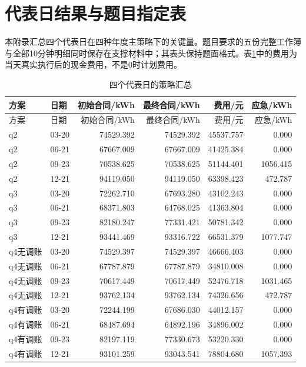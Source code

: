 \section{代表日结果与题目指定表}
\label{app:tables}

本附录汇总四个代表日在四种年度主策略下的关键量。题目要求的五份完整工作簿与全部10分钟明细同时保存在支撑材料中；其表头保持题面格式。表\ref{tab:rep-summary}中的费用为当天真实执行后的现金费用，不是0时计划费用。

\begin{longtable}{llrrrr}
\caption{四个代表日的策略汇总}\label{tab:rep-summary}\\
\toprule
方案 & 日期 & 初始合同/kWh & 最终合同/kWh & 费用/元 & 应急/kWh\\
\midrule
\endfirsthead
\toprule
方案 & 日期 & 初始合同/kWh & 最终合同/kWh & 费用/元 & 应急/kWh\\
\midrule
\endhead
q2 & 03-20 & 74529.392 & 74529.392 & 45537.757 & 0.000\\
q2 & 06-21 & 67667.009 & 67667.009 & 41425.384 & 0.000\\
q2 & 09-23 & 70538.625 & 70538.625 & 51144.401 & 1056.415\\
q2 & 12-21 & 94119.050 & 94119.050 & 63398.423 & 472.787\\
q3 & 03-20 & 72262.710 & 67693.280 & 43102.243 & 0.000\\
q3 & 06-21 & 68371.803 & 64768.025 & 41363.804 & 0.000\\
q3 & 09-23 & 82180.247 & 77331.421 & 50781.342 & 0.000\\
q3 & 12-21 & 93441.469 & 93316.722 & 66531.379 & 1077.747\\
q4无调账 & 03-20 & 74529.397 & 74529.397 & 46666.403 & 0.000\\
q4无调账 & 06-21 & 67787.879 & 67787.879 & 34810.008 & 0.000\\
q4无调账 & 09-23 & 70617.449 & 70617.449 & 52476.718 & 1031.465\\
q4无调账 & 12-21 & 93762.134 & 93762.134 & 74326.656 & 472.787\\
q4有调账 & 03-20 & 72244.199 & 67686.030 & 44012.157 & 0.000\\
q4有调账 & 06-21 & 68487.694 & 64892.196 & 34896.002 & 0.000\\
q4有调账 & 09-23 & 82197.119 & 77330.673 & 53220.330 & 0.000\\
q4有调账 & 12-21 & 93101.259 & 93043.541 & 78804.680 & 1057.393\\
\bottomrule
\end{longtable}

